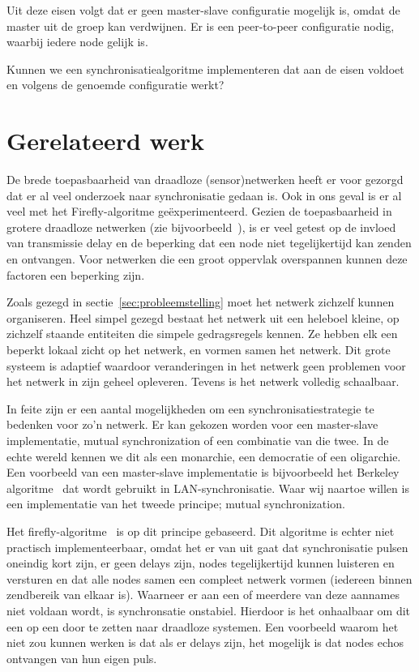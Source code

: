 \documentclass[a4paper,10pt]{article}
\begin{document}
Uit deze eisen volgt dat er geen master-slave configuratie mogelijk is, omdat de master uit de groep kan verdwijnen. Er is een peer-to-peer configuratie nodig, waarbij iedere node gelijk is.

Kunnen we een synchronisatiealgoritme implementeren dat aan de eisen voldoet en volgens de genoemde configuratie werkt?

\section{Gerelateerd werk}
De brede toepasbaarheid van draadloze (sensor)netwerken heeft er voor gezorgd dat er al veel onderzoek naar synchronisatie gedaan is. Ook in ons geval is er al veel met het Firefly-algoritme ge\"experimenteerd. Gezien de toepasbaarheid in grotere draadloze netwerken (zie bijvoorbeeld~\cite{tyrrell2010emergent}), is er veel getest op de invloed van transmissie delay en de beperking dat een node niet tegelijkertijd kan zenden en ontvangen. Voor netwerken die een groot oppervlak overspannen kunnen deze factoren een beperking zijn.

Zoals gezegd in sectie~\ref{sec:probleemstelling} moet het netwerk zichzelf kunnen organiseren. Heel simpel gezegd bestaat het netwerk uit een heleboel kleine, op zichzelf staande entiteiten die simpele gedragsregels kennen. Ze hebben elk een beperkt lokaal zicht op het netwerk, en vormen samen het netwerk. Dit grote systeem is adaptief waardoor veranderingen in het netwerk geen problemen voor het netwerk in zijn geheel opleveren. Tevens is het netwerk volledig schaalbaar.

In feite zijn er een aantal mogelijkheden om een synchronisatiestrategie te bedenken voor zo'n netwerk. Er kan gekozen worden voor een master-slave implementatie, mutual synchronization of een combinatie van die twee. In de echte wereld kennen we dit als een monarchie, een democratie of een oligarchie. Een voorbeeld van een master-slave implementatie is bijvoorbeeld het Berkeley algoritme~\cite{gusella1989accuracy} dat wordt gebruikt in LAN-synchronisatie. Waar wij naartoe willen is een implementatie van het tweede principe; mutual synchronization.

Het firefly-algoritme~\cite{yang2013firefly} is op dit principe gebaseerd. Dit algoritme is echter niet practisch implementeerbaar, omdat het er van uit gaat dat synchronisatie pulsen oneindig kort zijn, er geen delays zijn, nodes tegelijkertijd kunnen luisteren en versturen en dat alle nodes samen een compleet netwerk vormen (iedereen binnen zendbereik van elkaar is). Waarneer er aan een of meerdere van deze aannames niet voldaan wordt, is synchronsatie onstabiel. Hierdoor is het onhaalbaar om dit een op een door te zetten naar draadloze systemen. Een voorbeeld waarom het niet zou kunnen werken is dat als er delays zijn, het mogelijk is dat nodes echos ontvangen van hun eigen puls.
\end{document}
